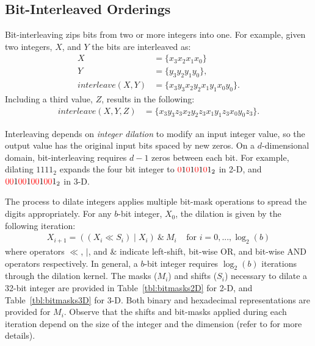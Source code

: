 \documentclass{report}
\begin{document}



\subsection{Bit-Interleaved Orderings}

Bit-interleaving zips bits from two or more integers into one. For example, given two integers, $X$, and $Y$ the bits are interleaved as:
\begin{align}
X &= \{x_3x_2x_1x_0\} \nonumber \\
Y &= \{y_3y_2y_1y_0\} ,\nonumber \\
interleave(X,Y) & = \{x_3y_3x_2y_2x_1y_1x_0y_0\}.
\end{align}
Including a third value, $Z$, results in the following: 
\begin{align*}
interleave(X,Y,Z) & = \{x_3y_3z_3x_2y_2z_3x_1y_1z_3x_0y_0z_3\}.
\end{align*}

Interleaving depends on \emph{integer dilation} to modify an input integer value, so the output value has the original input bits spaced by new zeros. On a $d$-dimensional domain, bit-interleaving requires $d-1$ zeros between each bit. For example, dilating $1111_2$ expands the four bit integer to ${\color{red}0}1{\color{red}0}1{\color{red}0}1{\color{red}0}1_2$ in 2-D, and ${\color{red}0}{\color{red}0}1{\color{red}0}{\color{red}0}1{\color{red}0}{\color{red}0}1{\color{red}0}{\color{red}0}1_2$ in 3-D. 


The process to dilate integers applies multiple bit-mask operations to spread the digits appropriately. 
For any $b$-bit integer, $X_0$, the dilation is given by the following iteration:
\begin{align}
X_{i+1} = ((X_i \ll S_i) \mid X_i)\ \&\ M_i \ \ \ \ \ \text{for }i=0,...,\log_2(b)
\label{eq:dilate}
\end{align}
where operators $\ll$, $\mid$, and $\&$ indicate left-shift, bit-wise OR, and bit-wise AND operators respectively. In general, a $b$-bit integer requires $\log_2(b)$ iterations through the dilation kernel. The masks ($M_i$) and shifts ($S_i$) necessary to dilate a 32-bit integer are provided in Table~\ref{tbl:bitmasks2D} for 2-D, and Table~\ref{tbl:bitmasks3D} for 3-D. Both binary and hexadecimal representations are provided for $M_i$. Observe that the shifts and bit-masks applied during each iteration depend on the size of the integer and the dimension (refer to \cite{Stocco2009} for more details). 
\end{document}

